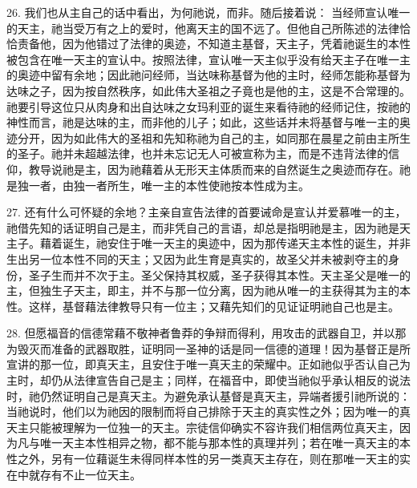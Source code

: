 26. 我们也从主自己的话中看出，为何祂说，而非。随后接着说：   当经师宣认唯一的天主，祂当受万有之上的爱时，他离天主的国不远了。但他自己所陈述的法律恰恰责备他，因为他错过了法律的奥迹，不知道主基督，天主子，凭着祂诞生的本性被包含在唯一天主的宣认中。按照法律，宣认唯一天主似乎没有给天主子在唯一主的奥迹中留有余地；因此祂问经师，当达味称基督为他的主时，经师怎能称基督为达味之子，因为按自然秩序，如此伟大圣祖之子竟也是他的主，这是不合常理的。祂要引导这位只从肉身和出自达味之女玛利亚的诞生来看待祂的经师记住，按祂的神性而言，祂是达味的主，而非他的儿子；如此，这些话并未将基督与唯一主的奥迹分开，因为如此伟大的圣祖和先知称祂为自己的主，如同那在晨星之前由主所生的圣子。祂并未超越法律，也并未忘记无人可被宣称为主，而是不违背法律的信仰，教导说祂是主，因为祂藉着从无形天主体质而来的自然诞生之奥迹而存在。祂是独一者，由独一者所生，唯一主的本性使祂按本性成为主。\par

27. 还有什么可怀疑的余地？主亲自宣告法律的首要诫命是宣认并爱慕唯一的主，祂借先知的话证明自己是主，而非凭自己的言语，却总是指明祂是主，因为祂是天主子。藉着诞生，祂安住于唯一天主的奥迹中，因为那传递天主本性的诞生，并非生出另一位本性不同的天主；又因为此生育是真实的，故圣父并未被剥夺主的身份，圣子生而并不次于主。圣父保持其权威，圣子获得其本性。天主圣父是唯一的主，但独生子天主，即主，并不与那一位分离，因为祂从唯一的主获得其为主的本性。这样，基督藉法律教导只有一位主；又藉先知们的见证证明祂自己也是主。\par

28. 但愿福音的信德常藉不敬神者鲁莽的争辩而得利，用攻击的武器自卫，并以那为毁灭而准备的武器取胜，证明同一圣神的话是同一信德的道理！因为基督正是所宣讲的那一位，即真天主，且安住于唯一真天主的荣耀中。正如祂似乎否认自己为主时，却仍从法律宣告自己是主；同样，在福音中，即使当祂似乎承认相反的说法时，祂仍然证明自己是真天主。为避免承认基督是真天主，异端者援引祂所说的：当祂说时，他们以为祂因的限制而将自己排除于天主的真实性之外；因为唯一的真天主只能被理解为一位独一的天主。宗徒信仰确实不容许我们相信两位真天主，因为凡与唯一天主本性相异之物，都不能与那本性的真理并列；若在唯一真天主的本性之外，另有一位藉诞生未得同样本性的另一类真天主存在，则在那唯一天主的实在中就存有不止一位天主。\par


